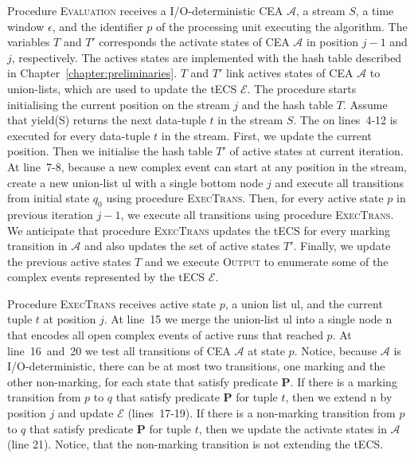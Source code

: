 Procedure \textsc{Evaluation} receives a I/O-deterministic CEA $\mathcal{A}$, a stream $S$, a time window $\epsilon$, and the identifier $p$ of the processing unit executing the algorithm. The variables $T$ and $T'$ corresponds the activate states of CEA $\mathcal{A}$ in position $j-1$ and $j$, respectively. The actives states are implemented with the hash table described in Chapter~\ref{chapter:preliminaries}. $T$ and $T'$ link actives states of CEA $\mathcal{A}$ to union-lists, which are used to update the tECS $\mathcal{E}$. The procedure starts initialising the current position on the stream $j$ and the hash table $T$. Assume that \textrm{yield(S)} returns the next data-tuple $t$ in the stream $S$. The  on lines~4-12 is executed for every data-tuple $t$ in the stream. First, we update the current position. Then we initialise the hash table $T'$ of active states at current iteration. At line~7-8, because a new complex event can start at any position in the stream, create a new union-list \textrm{ul} with a single bottom node $j$ and execute all transitions from initial state $q_{0}$ using procedure \textsc{ExecTrans}. Then, for every active state $p$ in previous iteration $j - 1$, we execute all transitions using procedure \textsc{ExecTrans}. We anticipate that procedure \textsc{ExecTrans} updates the tECS for every marking transition in $\mathcal{A}$ and also updates the set of active states $T'$. Finally, we update the previous active states $T$ and we execute \textsc{Output} to enumerate some of the complex events represented by the tECS $\mathcal{E}$.

Procedure \textsc{ExecTrans} receives active state $p$, a union list \textrm{ul}, and the current tuple $t$ at position $j$.  At line~15 we merge the union-list \textrm{ul} into a single node \textrm{n} that encodes all open complex events of active runs that reached $p$. At line~16~and~20 we test all transitions of CEA $\mathcal{A}$ at state $p$. Notice, because $\mathcal{A}$ is I/O-deterministic, there can be at most two transitions, one marking and the other non-marking, for each state that satisfy predicate \textbf{P}. If there is a marking transition from $p$ to $q$ that satisfy predicate \textbf{P} for tuple $t$, then  we extend \textrm{n} by position $j$ and update $\mathcal{E}$ (lines~17-19). If there is a non-marking transition from $p$ to $q$ that satisfy predicate \textbf{P} for tuple $t$, then we update the activate states in $\mathcal{A}$ (line 21). Notice, that the non-marking transition is not extending the tECS.

